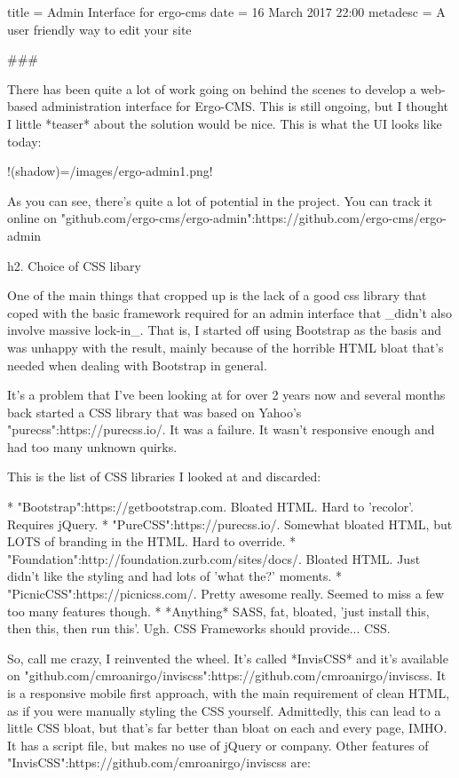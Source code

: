 title = Admin Interface for ergo-cms
date = 16 March 2017 22:00
metadesc = A user friendly way to edit your site

###

There has been quite a lot of work going on behind the scenes to develop a web-based administration interface for Ergo-CMS. This is still ongoing, but I thought I little *teaser* about the solution would be nice. This is what the UI looks like today:

!(shadow)=/images/ergo-admin1.png!

As you can see, there's quite a lot of potential in the project. You can track it online on "github.com/ergo-cms/ergo-admin":https://github.com/ergo-cms/ergo-admin

h2. Choice of CSS libary

One of the main things that cropped up is the lack of a good css library that coped with the basic framework required for an admin interface that _didn't also involve massive lock-in_. That is, I started off using Bootstrap as the basis and was unhappy with the result, mainly because of the horrible HTML bloat that's needed when dealing with Bootstrap in general. 

It's a problem that I've been looking at for over 2 years now and several months back started a CSS library that was based on Yahoo's "purecss":https://purecss.io/. It was a failure. It wasn't responsive enough and had too many unknown quirks.

This is the list of CSS libraries I looked at and discarded:

* "Bootstrap":https://getbootstrap.com. Bloated HTML. Hard to 'recolor'. Requires jQuery.
* "PureCSS":https://purecss.io/. Somewhat bloated HTML, but LOTS of branding in the HTML. Hard to override.
* "Foundation":http://foundation.zurb.com/sites/docs/. Bloated HTML. Just didn't like the styling and had lots of 'what the?' moments.
* "PicnicCSS":https://picnicss.com/. Pretty awesome really. Seemed to miss a few too many features though.
* *Anything* SASS, fat, bloated, 'just install this, then this, then run this'. Ugh. CSS Frameworks should provide... CSS.

So, call me crazy, I reinvented the wheel. It's called *InvisCSS* and it's available on "github.com/cmroanirgo/inviscss":https://github.com/cmroanirgo/inviscss. It is a responsive mobile first approach, with the main requirement of clean HTML, as if you were manually styling the CSS yourself. Admittedly, this can lead to a little CSS bloat, but that's far better than bloat on each and every page, IMHO. It has a script file, but makes no use of jQuery or company. Other features of "InvisCSS":https://github.com/cmroanirgo/inviscss are:

